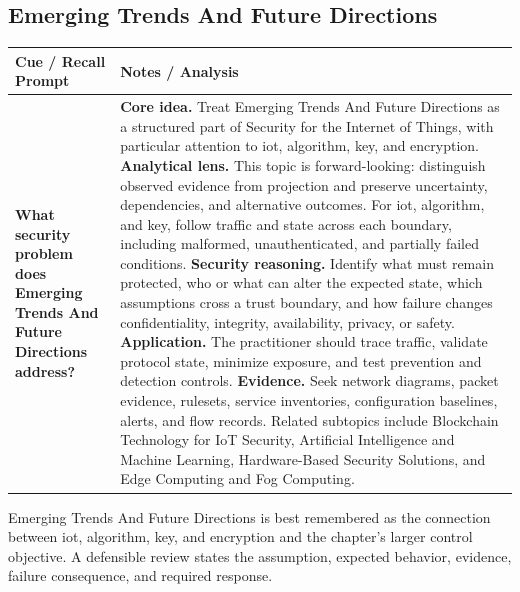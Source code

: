 \documentclass[11pt]{article}
\newcommand{\CornellHeader}{%
\rowcolor{Navy}\color{white}\bfseries Cue / Recall Prompt & \color{white}\bfseries Notes / Analysis\\\hline}
\newcommand{\CornellRow}[2]{%
\cellcolor{CueGray}\RaggedRight\textbf{#1} & \RaggedRight #2\\\hline}
\begin{document}
\subsection*{Emerging Trends And Future Directions}
\begin{longtable}{>{\RaggedRight\arraybackslash}p{}|>{\RaggedRight\arraybackslash}p{}}
\CornellHeader
\CornellRow{What security problem does Emerging Trends And Future Directions address?}{\textbf{Core idea.} Treat Emerging Trends And Future Directions as a structured part of Security for the Internet of Things, with particular attention to iot, algorithm, key, and encryption. \textbf{Analytical lens.} This topic is forward-looking: distinguish observed evidence from projection and preserve uncertainty, dependencies, and alternative outcomes. For iot, algorithm, and key, follow traffic and state across each boundary, including malformed, unauthenticated, and partially failed conditions. \textbf{Security reasoning.} Identify what must remain protected, who or what can alter the expected state, which assumptions cross a trust boundary, and how failure changes confidentiality, integrity, availability, privacy, or safety. \textbf{Application.} The practitioner should trace traffic, validate protocol state, minimize exposure, and test prevention and detection controls. \textbf{Evidence.} Seek network diagrams, packet evidence, rulesets, service inventories, configuration baselines, alerts, and flow records. Related subtopics include Blockchain Technology for IoT Security, Artificial Intelligence and Machine Learning, Hardware-Based Security Solutions, and Edge Computing and Fog Computing.}
\end{longtable}
\begin{topicsummary}
Emerging Trends And Future Directions is best remembered as the connection between iot, algorithm, key, and encryption and the chapter's larger control objective. A defensible review states the assumption, expected behavior, evidence, failure consequence, and required response.
\end{topicsummary}
\end{document}
